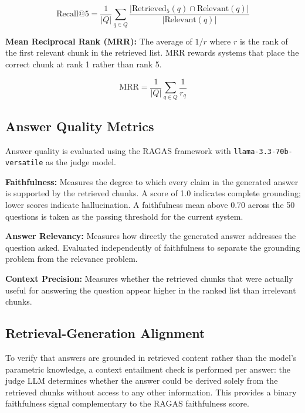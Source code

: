 \documentclass[12pt,a4paper]{report}
\begin{document}
\begin{equation}
\text{Recall@5} = \frac{1}{|Q|} \sum_{q \in Q}
\frac{|\text{Retrieved}_5(q) \cap \text{Relevant}(q)|}{|\text{Relevant}(q)|}
\end{equation}

\textbf{Mean Reciprocal Rank (MRR):} The average of $1/r$ where $r$ is the rank
of the first relevant chunk in the retrieved list. MRR rewards systems that
place the correct chunk at rank 1 rather than rank 5.

\begin{equation}
\text{MRR} = \frac{1}{|Q|} \sum_{q \in Q} \frac{1}{r_q}
\end{equation}

\subsection{Answer Quality Metrics}

Answer quality is evaluated using the RAGAS framework with
\texttt{llama-3.3-70b-versatile} as the judge model.

\textbf{Faithfulness:} Measures the degree to which every claim in the generated
answer is supported by the retrieved chunks. A score of 1.0 indicates complete
grounding; lower scores indicate hallucination. A faithfulness mean above 0.70
across the 50 questions is taken as the passing threshold for the current system.

\textbf{Answer Relevancy:} Measures how directly the generated answer addresses
the question asked. Evaluated independently of faithfulness to separate the
grounding problem from the relevance problem.

\textbf{Context Precision:} Measures whether the retrieved chunks that were
actually useful for answering the question appear higher in the ranked list than
irrelevant chunks.

\subsection{Retrieval-Generation Alignment}

To verify that answers are grounded in retrieved content rather than the model's
parametric knowledge, a context entailment check is performed per answer: the
judge LLM determines whether the answer could be derived solely from the
retrieved chunks without access to any other information. This provides a binary
faithfulness signal complementary to the RAGAS faithfulness score.
\end{document}
